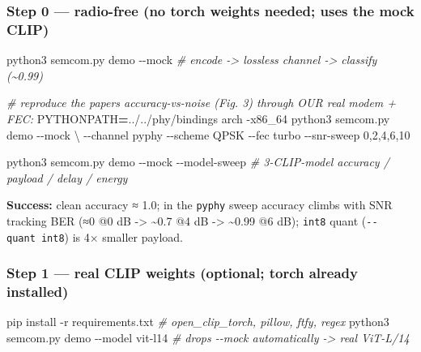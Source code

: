 \documentclass[
  9.5pt,
]{article}
\newenvironment{Shaded}{\begin{snugshade}}{\end{snugshade}}
\newcommand{\AttributeTok}[1]{\textcolor[rgb]{0.77,0.63,0.00}{#1}}
\newcommand{\CommentTok}[1]{\textcolor[rgb]{0.56,0.35,0.01}{\textit{#1}}}
\newcommand{\DataTypeTok}[1]{\textcolor[rgb]{0.13,0.29,0.53}{#1}}
\newcommand{\ExtensionTok}[1]{#1}
\newcommand{\FunctionTok}[1]{\textcolor[rgb]{0.00,0.00,0.00}{#1}}
\newcommand{\NormalTok}[1]{#1}
\newcommand{\OperatorTok}[1]{\textcolor[rgb]{0.81,0.36,0.00}{\textbf{#1}}}
\newcommand{\VariableTok}[1]{\textcolor[rgb]{0.00,0.00,0.00}{#1}}
\begin{document}
\hypertarget{step-0--radio-free-no-torch-weights-needed-uses-the-mock-clip}{%
\subsubsection{Step 0 --- radio-free (no torch weights needed; uses the
mock
CLIP)}\label{step-0--radio-free-no-torch-weights-needed-uses-the-mock-clip}}

\begin{Shaded}
\begin{Highlighting}[]
\ExtensionTok{python3}\NormalTok{ semcom.py demo }\AttributeTok{{-}{-}mock}                       \CommentTok{\# encode {-}\textgreater{} lossless channel {-}\textgreater{} classify (\textasciitilde{}0.99)}

\CommentTok{\# reproduce the paper\textquotesingle{}s accuracy{-}vs{-}noise (Fig. 3) through OUR real modem + FEC:}
\VariableTok{PYTHONPATH}\OperatorTok{=}\NormalTok{../../phy/bindings }\FunctionTok{arch} \AttributeTok{{-}x86\_64}\NormalTok{ python3 semcom.py demo }\AttributeTok{{-}{-}mock} \DataTypeTok{\textbackslash{}}
        \AttributeTok{{-}{-}channel}\NormalTok{ pyphy }\AttributeTok{{-}{-}scheme}\NormalTok{ QPSK }\AttributeTok{{-}{-}fec}\NormalTok{ turbo }\AttributeTok{{-}{-}snr{-}sweep}\NormalTok{ 0,2,4,6,10}

\ExtensionTok{python3}\NormalTok{ semcom.py demo }\AttributeTok{{-}{-}mock} \AttributeTok{{-}{-}model{-}sweep}         \CommentTok{\# 3{-}CLIP{-}model accuracy / payload / delay / energy}
\end{Highlighting}
\end{Shaded}

\textbf{Success:} clean accuracy ≈ 1.0; in the \texttt{pyphy} sweep
accuracy climbs with SNR tracking BER (≈0 @0 dB -\textgreater{}
\textasciitilde0.7 @4 dB -\textgreater{} \textasciitilde0.99 @6 dB);
\texttt{int8} quant (\texttt{-\/-quant\ int8}) is 4× smaller payload.

\hypertarget{step-1--real-clip-weights-optional-torch-already-installed}{%
\subsubsection{Step 1 --- real CLIP weights (optional; torch already
installed)}\label{step-1--real-clip-weights-optional-torch-already-installed}}

\begin{Shaded}
\begin{Highlighting}[]
\ExtensionTok{pip}\NormalTok{ install }\AttributeTok{{-}r}\NormalTok{ requirements.txt        }\CommentTok{\# open\_clip\_torch, pillow, ftfy, regex}
\ExtensionTok{python3}\NormalTok{ semcom.py demo }\AttributeTok{{-}{-}model}\NormalTok{ vit{-}l14 }\CommentTok{\# drops {-}{-}mock automatically {-}\textgreater{} real ViT{-}L/14}
\end{Highlighting}
\end{Shaded}
\end{document}
